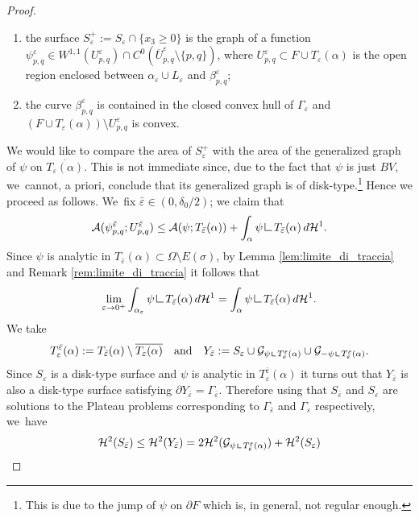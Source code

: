 \documentclass[11pt]{article}
\numberwithin{equation}{section}
\let\eps\varepsilon
\let\Om\Omega
\newcommand{\resa}{\mathop{\hbox{\vrule height 7pt width 0.5pt depth 0pt
\vrule height 0.5pt width 6pt depth 0pt}}\nolimits}
\newcommand{\resb}{\mathop{\hbox{\vrule height 4pt width 0.5pt depth 0pt
\vrule height 0.5pt width 3pt depth 0pt}}\nolimits}
\newcommand{\res}{\mathchoice{\resa}{\resa}{\resb}{\resb}}
\theoremstyle{definition}
\begin{document}
\begin{proof}
\begin{enumerate}[{\rm (1)},wide]
\item the surface $S^+_\eps:=S_\eps\cap\{x_3\ge0\}$
is the graph of a function $\psi_{p,q}^\eps\in W^{1,1}( U_{p,q}^\eps)
\cap C^0(\overline U_{p,q}^\eps\setminus\{p,q\})$, where $U_{p,q}^\eps\subset F\cup T_\eps(\alpha)$ is the open region enclosed between $\alpha_\eps\cup L_\eps$ and $\beta_{p,q}^{\eps}$;
\item the curve $\beta_{p,q}^\eps$ is contained in the closed
convex hull of $\Gamma_\eps$ and $( F\cup T_\eps(\alpha))\setminus U_{p,q}^\eps$ is convex.
\end{enumerate}
We would like to compare the area of $S_\eps^+$ with the area of the generalized graph of $\psi$ on $\overline {T_\eps(\alpha)}$. This is not immediate since, due to the fact that $\psi$ is just $BV$, we~cannot, a priori, conclude that its generalized graph is of disk-type.\footnote{This is due to the jump of $\psi$ on $\partial F$ which is, in general, not regular enough.} Hence we proceed as follows. We~fix $\bar\eps\in(0,\delta_0/2)$; we claim that
\begin{equation}\label{eq:comparison-with-plateau}
\mathcal{A}(\psi_{p,q}^{\bar\eps}; U_{p,q}^{\bar\eps})
\le
\mathcal{A}(\psi; T_{\bar\eps}(\alpha))+
\int_{\alpha}\psi\res{T_{\bar\eps}(\alpha)}\,d\mathcal{H}^1.
\end{equation}
Since $\psi$ is analytic in $T_{\bar\eps}(\alpha)\subset\Om\setminus E(\sigma)$, by Lemma \ref{lem:limite_di_traccia} and Remark \ref{rem:limite_di_traccia} it follows that
\begin{equation}\label{claim}
\lim_{\eps\to0^+}
\int_{\alpha_\eps}\psi\res{T_{\bar\eps}(\alpha)}\,d\mathcal{H}^1=\int_{\alpha}\psi\res{T_{\bar\eps}(\alpha)}\,d\mathcal{H}^1.
\end{equation}
We take
\[
T_{\eps}^{\bar\eps}(\alpha):={T_{\bar\eps}(\alpha)\setminus \overline {T_{\eps}(\alpha)}}\quad\text{and}\quad Y_{\bar\eps}:=S_{\eps}\cup\mathcal{G}_{\psi\res T_\eps^{\bar\eps}(\alpha)} \cup\mathcal{G}_{-\psi\res T_\eps^{\bar\eps}(\alpha)}.
\]
Since $S_\eps$ is a disk-type surface and $\psi$ is analytic in $T_\eps^{\bar\eps}(\alpha)$ it turns out that $Y_{\bar\eps}$ is also a disk-type surface satisfying $\partial Y_{\bar\eps}=\Gamma_{\bar\eps}$. Therefore using that $S_{\bar\eps}$ and $S_\eps$ are solutions to the Plateau problems corresponding to $\Gamma_{\bar\eps}$ and $\Gamma_\eps$ respectively, we~have
\begin{equation*}
\begin{split}
\mathcal{H}^2(S_{\bar\eps})\le \mathcal{H}^2(Y_{\bar\eps})&= 2\mathcal{H}^2(\mathcal{G}_{\psi\res T_\eps^{\bar\eps}(\alpha)} )+\mathcal{H}^2(S_\eps)\\

\end{split}
\end{equation*}
\end{proof}
\end{document}
